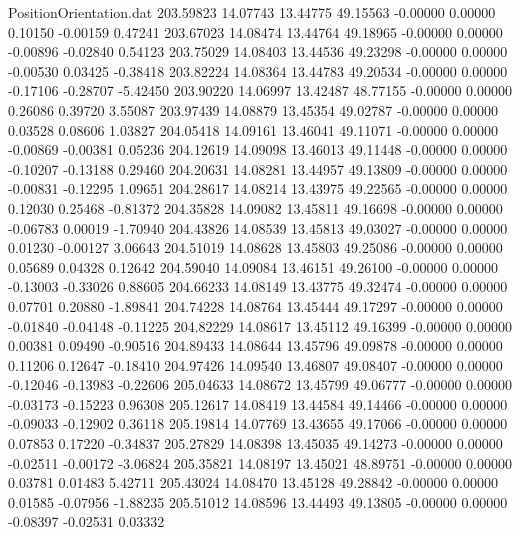 \begin{filecontents}{PositionOrientation.dat}
 203.59823   14.07743   13.44775    49.15563   -0.00000    0.00000    0.10150   -0.00159    0.47241
 203.67023   14.08474   13.44764    49.18965   -0.00000    0.00000   -0.00896   -0.02840    0.54123
 203.75029   14.08403   13.44536    49.23298   -0.00000    0.00000   -0.00530    0.03425   -0.38418
 203.82224   14.08364   13.44783    49.20534   -0.00000    0.00000   -0.17106   -0.28707   -5.42450
 203.90220   14.06997   13.42487    48.77155   -0.00000    0.00000    0.26086    0.39720    3.55087
 203.97439   14.08879   13.45354    49.02787   -0.00000    0.00000    0.03528    0.08606    1.03827
 204.05418   14.09161   13.46041    49.11071   -0.00000    0.00000   -0.00869   -0.00381    0.05236
 204.12619   14.09098   13.46013    49.11448   -0.00000    0.00000   -0.10207   -0.13188    0.29460
 204.20631   14.08281   13.44957    49.13809   -0.00000    0.00000   -0.00831   -0.12295    1.09651
 204.28617   14.08214   13.43975    49.22565   -0.00000    0.00000    0.12030    0.25468   -0.81372
 204.35828   14.09082   13.45811    49.16698   -0.00000    0.00000   -0.06783    0.00019   -1.70940
 204.43826   14.08539   13.45813    49.03027   -0.00000    0.00000    0.01230   -0.00127    3.06643
 204.51019   14.08628   13.45803    49.25086   -0.00000    0.00000    0.05689    0.04328    0.12642
 204.59040   14.09084   13.46151    49.26100   -0.00000    0.00000   -0.13003   -0.33026    0.88605
 204.66233   14.08149   13.43775    49.32474   -0.00000    0.00000    0.07701    0.20880   -1.89841
 204.74228   14.08764   13.45444    49.17297   -0.00000    0.00000   -0.01840   -0.04148   -0.11225
 204.82229   14.08617   13.45112    49.16399   -0.00000    0.00000    0.00381    0.09490   -0.90516
 204.89433   14.08644   13.45796    49.09878   -0.00000    0.00000    0.11206    0.12647   -0.18410
 204.97426   14.09540   13.46807    49.08407   -0.00000    0.00000   -0.12046   -0.13983   -0.22606
 205.04633   14.08672   13.45799    49.06777   -0.00000    0.00000   -0.03173   -0.15223    0.96308
 205.12617   14.08419   13.44584    49.14466   -0.00000    0.00000   -0.09033   -0.12902    0.36118
 205.19814   14.07769   13.43655    49.17066   -0.00000    0.00000    0.07853    0.17220   -0.34837
 205.27829   14.08398   13.45035    49.14273   -0.00000    0.00000   -0.02511   -0.00172   -3.06824
 205.35821   14.08197   13.45021    48.89751   -0.00000    0.00000    0.03781    0.01483    5.42711
 205.43024   14.08470   13.45128    49.28842   -0.00000    0.00000    0.01585   -0.07956   -1.88235
 205.51012   14.08596   13.44493    49.13805   -0.00000    0.00000   -0.08397   -0.02531    0.03332

\end{filecontents}
